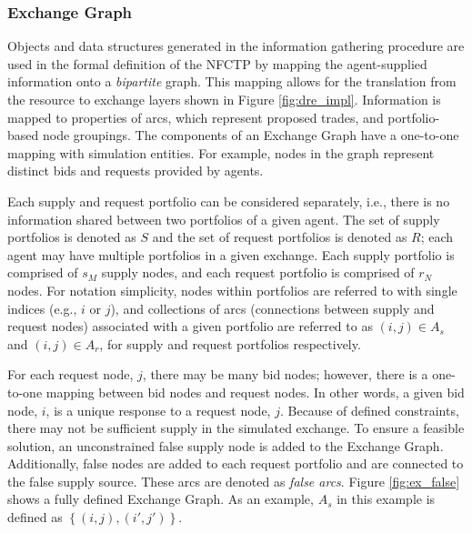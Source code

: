 \subsubsection{Exchange Graph}

Objects and data structures generated in the information gathering procedure are
used in the formal definition of the NFCTP by mapping the agent-supplied
information onto a \textit{bipartite} graph. This mapping allows for the
translation from the resource to exchange layers shown in Figure
\ref{fig:dre_impl}. Information is mapped to properties of arcs, which represent
proposed trades, and portfolio-based node groupings. The components of an
Exchange Graph have a one-to-one mapping with simulation entities. For example,
nodes in the graph represent distinct bids and requests provided by agents.

Each supply and request portfolio can be considered separately, i.e., there is
no information shared between two portfolios of a given agent. The set of supply
portfolios is denoted as $S$ and the set of request portfolios is denoted as
$R$; each agent may have multiple portfolios in a given exchange. Each
supply portfolio is comprised of $s_M$ supply nodes, and each request portfolio
is comprised of $r_N$ nodes. For notation simplicity, nodes within portfolios
are referred to with single indices (e.g., $i$ or $j$), and collections of arcs
(connections between supply and request nodes) associated with a given portfolio
are referred to as $(i, j) \in A_s$ and $(i, j) \in A_r$, for supply and request
portfolios respectively.

For each request node, $j$, there may be many bid nodes; however, there is a
one-to-one mapping between bid nodes and request nodes. In other words, a given
bid node, $i$, is a unique response to a request node, $j$. Because of defined
constraints, there may not be sufficient supply in the simulated exchange. To
ensure a feasible solution, an unconstrained false supply node is added to the
Exchange Graph. Additionally, false nodes are added to each request portfolio
and are connected to the false supply source. These arcs are denoted as
\textit{false arcs}. Figure \ref{fig:ex_false} shows a fully defined Exchange
Graph. As an example, $A_s$ in this example is defined as 
$\left \{ (i, j), (i', j') \right \}$.

